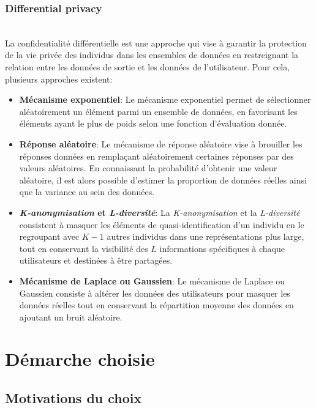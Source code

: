 \documentclass{article}
\begin{document}
\subsubsection{Differential privacy}
$ $\\
La confidentialité différentielle est une approche qui vise à garantir la protection de la vie privée des individus dans les ensembles de données en restreignant la relation entre les données de sortie et les données de l'utilisateur.
Pour cela, plusieurs approches existent:\\
\begin{itemize}
\item \textbf{Mécanisme exponentiel}: Le mécanisme exponentiel permet de sélectionner aléatoirement un élément parmi un ensemble de données, en favorisant les éléments ayant le plus de poids selon une fonction d'évaluation donnée.
\item \textbf{Réponse aléatoire}: Le mécanisme de réponse aléatoire vise à brouiller les réponses données en remplaçant aléatoirement certaines réponses par des valeurs aléatoires.
En connaissant la probabilité d'obtenir une valeur aléatoire, il est alors possible d'estimer la proportion de données réelles ainsi que la variance au sein des données.
\item \textbf{\emph{K-anonymisation} et \emph{L-diversité}}: La \emph{K-anonymisation} et la \emph{L-diversité} consistent à masquer les éléments de quasi-identification d'un
 individu en le regroupant avec $K-1$ autres individus dans une représentations plus large, tout en conservant la visibilité des $L$ informations spécifiques à chaque utilisateurs et destinées à être partagées.
\item \textbf{Mécanisme de Laplace ou Gaussien}: Le mécanisme de Laplace ou Gaussien consiste à altérer les données des utilisateurs pour masquer les données réelles tout en conservant la répartition moyenne des données en ajoutant un bruit aléatoire.
\end{itemize}
\section{Démarche choisie}
\subsection{Motivations du choix}
\end{document}
